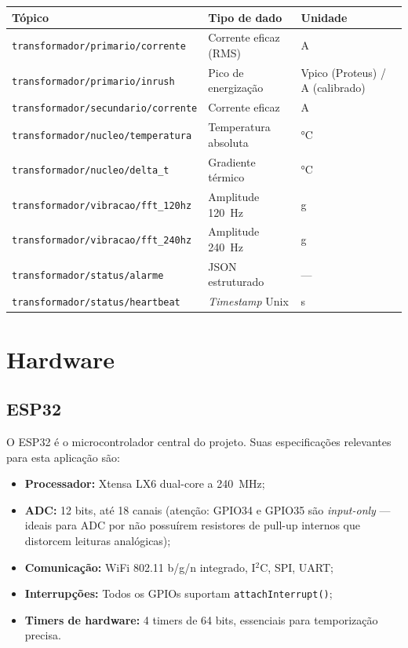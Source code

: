 \documentclass[12pt, a4paper]{article}
\begin{document}
\begin{center}
\begin{tabular}{lll}
\toprule
\textbf{Tópico} & \textbf{Tipo de dado} & \textbf{Unidade} \\
\midrule
\texttt{transformador/primario/corrente}     & Corrente eficaz (RMS)       & A      \\
\texttt{transformador/primario/inrush}       & Pico de energização         & Vpico (Proteus) / A (calibrado) \\
\texttt{transformador/secundario/corrente}   & Corrente eficaz             & A      \\
\texttt{transformador/nucleo/temperatura}    & Temperatura absoluta        & °C     \\
\texttt{transformador/nucleo/delta\_t}       & Gradiente térmico           & °C     \\
\texttt{transformador/vibracao/fft\_120hz}   & Amplitude 120~Hz            & g      \\
\texttt{transformador/vibracao/fft\_240hz}   & Amplitude 240~Hz            & g      \\
\texttt{transformador/status/alarme}         & JSON estruturado            & ---    \\
\texttt{transformador/status/heartbeat}      & \textit{Timestamp} Unix     & s      \\
\bottomrule
\end{tabular}
\end{center}

\section{Hardware}

\subsection{ESP32}

O ESP32 é o microcontrolador central do projeto. Suas especificações relevantes para esta aplicação são:

\begin{itemize}[leftmargin=2cm]
    \item \textbf{Processador:} Xtensa LX6 dual-core a 240~MHz;
    \item \textbf{ADC:} 12 bits, até 18 canais (atenção: GPIO34 e GPIO35 são \textit{input-only} --- ideais para ADC por não possuírem resistores de pull-up internos que distorcem leituras analógicas);
    \item \textbf{Comunicação:} WiFi 802.11 b/g/n integrado, I$^2$C, SPI, UART;
    \item \textbf{Interrupções:} Todos os GPIOs suportam \texttt{attachInterrupt()};
    \item \textbf{Timers de hardware:} 4 timers de 64 bits, essenciais para temporização precisa.
\end{itemize}
\end{document}
